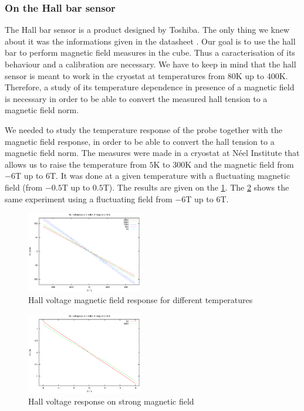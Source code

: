 \documentclass[journal]{IEEEtran}
\begin{document}
\subsubsection{On the Hall bar sensor}
The Hall bar sensor is a product designed by Toshiba. The only thing we knew about it was the informations given in the datasheet \cite{toshiba}. Our goal is to use the hall bar to perform magnetic field measures in the cube. Thus a caracterisation of its behaviour and a calibration are necessary. We have to keep in mind that the hall sensor is meant to work in the cryostat at temperatures from 80K up to 400K. Therefore, a study of its temperature dependence in presence of a magnetic field is necessary in order to be able to convert the measured hall tension to a magnetic field norm.

We needed to study the temperature response of the probe together with the magnetic field response, in order to be able to convert the hall tension to a magnetic field norm. The measures were made in a cryostat at Néel Institute that allows us to raise the temperature from $5$K to $300$K and the magnetic field from $-6$T up to $6$T. It was done at a given temperature with a fluctuating magnetic field (from $-0.5$T up to $0.5$T). The results are given on the \figurename \ref{fig:hall_champ}. The \figurename \ref{fig:hall_champ_6} shows the same experiment using a fluctuating field from $-6$T up to $6$T.

\begin{figure}[h]
\centering
\includegraphics[width=0.45\textwidth]{tension_hall_fonction_champ.eps}
\caption{Hall voltage magnetic field response for different temperatures}
\label{fig:hall_champ}
\end{figure}

\begin{figure}[h]
\centering
\includegraphics[width=0.45\textwidth]{tension_hall_fonction_champ_6T.eps}
\caption{Hall voltage response on strong magnetic field}
\label{fig:hall_champ_6}
\end{figure}
\end{document}
